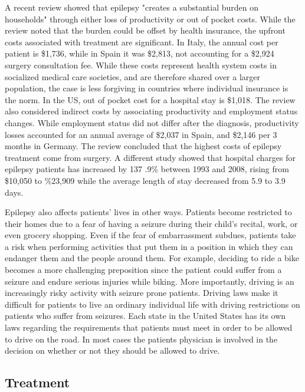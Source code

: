 A recent review \cite{Allers2015} showed that epilepsy "creates a substantial burden on households" through either loss of productivity or out of pocket costs. While the review noted that the burden could be offset by health insurance, the upfront costs associated with treatment are significant. In Italy, the annual cost per patient is \$1,736, while in Spain it was \$2,813, not accounting for a \$2,924 surgery consultation fee. While these costs represent health system costs in socialized medical care societies, and are therefore shared over a larger population, the case is less forgiving in countries where individual insurance is the norm. In the US, out of pocket cost for a hospital stay is \$1,018. The review also considered indirect costs by associating productivity and employment status changes. While employment status did not differ after the diagnosis, productivity losses accounted for an annual average of \$2,037 in Spain, and \$2,146 per 3 months in Germany. The review concluded that the highest costs of epilepsy treatment come from surgery. A different study \cite{vivas2012health} showed that hospital charges for epilepsy patients has increased by 137
.9\% between 1993 and 2008, rising from \$10,050 to \%23,909 while the average length of stay decreased from 5.9 to 3.9 days.

Epilepsy also affects patients' lives in other ways. Patients become restricted to their homes due to a fear of having a seizure during their child's recital, work, or even grocery shopping. Even if the fear of embarrassment subdues, patients take a risk when performing activities that put them in a position in which they can endanger them and the people around them. For example, deciding to ride a bike becomes a more challenging preposition since the patient could suffer from a seizure and endure serious injuries while biking. More importantly, driving is an increasingly risky activity with seizure prone patients. Driving laws make it difficult for patients to live an ordinary individual life with driving restrictions on patients who suffer from seizures. Each state in the United States has its own laws regarding the requirements that patients must meet in order to be allowed to drive on the road. In most cases the patients physician is involved in the decision on whether or not they should be allowed to drive. 

\subsection{Treatment}

